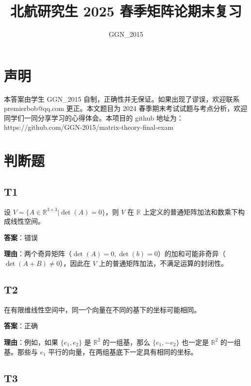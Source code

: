 \documentclass{article}
\title{北航研究生 2025 春季矩阵论期末复习}
\author{GGN\_2015}
\date{}
\begin{document}
\maketitle

\section{声明}

本答案由学生 GGN\_2015 自制，正确性并无保证。如果出现了谬误，欢迎联系 premierbob@qq.com 更正。本文题目为 2024 春季期末考试试题与考点分析，欢迎同学们一同分享学习的心得体会。本项目的 github 地址为：https://github.com/GGN-2015/matrix-theory-final-exam

\newpage

\tableofcontents

\newpage

\section{判断题}

\subsection{T1}

\par 设 \(V=\{A\in \mathbb R^{3\times 3}| \det(A) = 0\}\)，则 $V$ 在 $\mathbb R$ 上定义的普通矩阵加法和数乘下构成线性空间。

\par \textbf{答案}：错误

\par \textbf{理由}：两个奇异矩阵（$\det(A)=0, \det(b)=0$）的加和可能非奇异（$\det(A+B)\neq 0$），因此在 $V$ 上的普通矩阵加法，不满足运算的封闭性。

\subsection{T2}

\par 在有限维线性空间中，同一个向量在不同的基下的坐标可能相同。

\par \textbf{答案}：正确

\par \textbf{理由}：例如，如果 $\{e_1, e_2\}$ 是 $\mathbb R^2$ 的一组基，那么 \(\{e_1, -e_2\}\) 也一定是 $\mathbb R^2$ 的一组基。那些与 $e_1$ 平行的向量，在两组基底下一定具有相同的坐标。

\subsection{T3}
\end{document}
